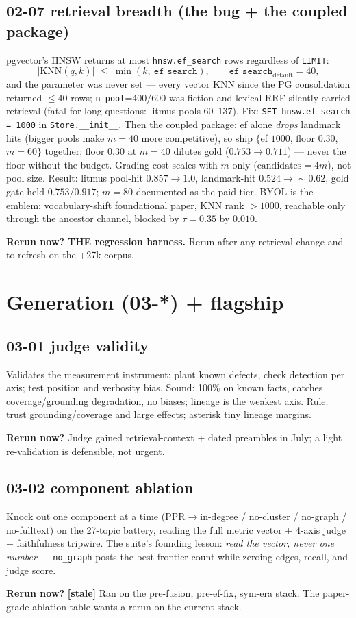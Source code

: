 \documentclass[10pt]{article}
\newcommand{\rerun}[1]{\par\smallskip\noindent\textbf{Rerun now?} #1}
\newcommand{\stale}{\textbf{[stale]} }
\begin{document}
\subsection*{02-07 retrieval breadth (the bug + the coupled package)}
pgvector's HNSW returns at most \texttt{hnsw.ef\_search} rows regardless of \texttt{LIMIT}:
\begin{equation}
|\mathrm{KNN}(q, k)| \;\le\; \min(k,\ \texttt{ef\_search}),
\qquad \texttt{ef\_search}_{\text{default}} = 40 ,
\end{equation}
and the parameter was never set --- every vector KNN since the PG consolidation returned
$\le 40$ rows; \texttt{n\_pool}=400/600 was fiction and lexical RRF silently carried retrieval
(fatal for long questions: litmus pools 60--137). Fix: \texttt{SET hnsw.ef\_search = 1000} in
\texttt{Store.\_\_init\_\_}. Then the coupled package: ef alone \emph{drops} landmark hits
(bigger pools make $m{=}40$ more competitive), so ship $\{$ef $1000$, floor $0.30$, $m{=}60\}$
together; floor $0.30$ at $m{=}40$ dilutes gold ($0.753\to0.711$) --- never the floor without
the budget. Grading cost scales with $m$ only ($\text{candidates}=4m$), not pool size. Result:
litmus pool-hit $0.857\to1.0$, landmark-hit $0.524\to{\sim}0.62$, gold gate held $0.753/0.917$;
$m{=}80$ documented as the paid tier. BYOL is the emblem: vocabulary-shift foundational paper,
KNN rank $>1000$, reachable only through the ancestor channel, blocked by $\tau=0.35$ by $0.010$.
\rerun{\textbf{THE regression harness.} Rerun after any retrieval change and to refresh on the
+27k corpus.}

\section{Generation (03-*) + flagship}

\subsection*{03-01 judge validity}
Validates the measurement instrument: plant known defects, check detection per axis; test
position and verbosity bias. Sound: 100\% on known facts, catches coverage/grounding
degradation, no biases; lineage is the weakest axis. Rule: trust grounding/coverage and large
effects; asterisk tiny lineage margins.
\rerun{Judge gained retrieval-context + dated preambles in July; a light re-validation is
defensible, not urgent.}

\subsection*{03-02 component ablation}
Knock out one component at a time (PPR$\to$in-degree / no-cluster / no-graph / no-fulltext) on
the 27-topic battery, reading the full metric vector + 4-axis judge + faithfulness tripwire.
The suite's founding lesson: \emph{read the vector, never one number} --- \texttt{no\_graph}
posts the best frontier count while zeroing edges, recall, and judge score.
\rerun{\stale Ran on the pre-fusion, pre-ef-fix, sym-era stack. The paper-grade ablation table
wants a rerun on the current stack.}
\end{document}
